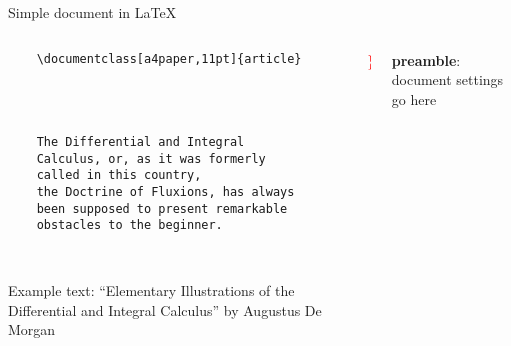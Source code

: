 \copyrightTim

\begin{frame}[fragile, t]{Simple document in \LaTeX}
	\begin{columns}[t]
        \begin{column}{0.5\textwidth}
			\vspace{-20pt}
	\begin{verbatim} 
	\documentclass[a4paper,11pt]{article}

		
	

	The Differential and Integral 
	Calculus, or, as it was formerly 
	called in this country, 
	the Doctrine of Fluxions, has always 
	been supposed to present remarkable 
	obstacles to the beginner.

	
	\end{verbatim}

	{\tiny
	Example text: ``Elementary Illustrations of the Differential and Integral Calculus''
	by Augustus De Morgan
	\par}
\end{column}
\begin{column}{0.05\textwidth}
	\vspace{0pt}

	{\Huge \textcolor{red}{ \} } }
	\\[1.5cm]
	\phantom{{\Huge \textcolor{red}{ \} } }}
	
\end{column}
\begin{column}{0.4\textwidth}
	\vspace{0pt}
	
	\textbf{preamble}: document settings go here
	\\[1.5cm]
\end{column}
\end{columns}

\end{frame}
